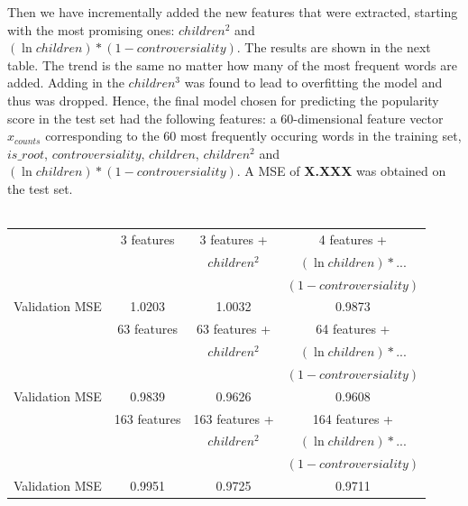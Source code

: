 \documentclass[11pt]{article}
\begin{document}
Then we have incrementally added the new features that were extracted, starting with the most promising ones: $children^{2}$ and $(\ln children)*(1-controversiality)$. The results are shown in the next table. The trend is the same no matter how many of the most frequent words are added. Adding in the $children^{3}$ was found to lead to overfitting the model and thus was dropped. Hence, the final model chosen for predicting the popularity score in the test set had the following features: a 60-dimensional feature vector $x_{counts}$ corresponding to the 60 most frequently occuring words in the training set, $is\_root$, $controversiality$, $children$, $children^{2}$ and $(\ln children)*(1-controversiality)$. A MSE of \textbf{X.XXX} was obtained on the test set. \\
\\

\begin{table}[h]
\centering
\begin{scriptsize}
\begin{tabular}[@{}c@{}]{|@{}c@{}|@{}c@{}|@{}c@{}|@{}c@{}|}
  \hline
   & 3 features & 3 features +  & 4 features + \\
   &  & $children^{2}$ &  $(\ln children)* ...$ \\
   &  &  &  $(1-controversiality)$ \\
   \hline
   Validation MSE & 1.0203 & 1.0032 & 0.9873\\
   \hline   
   \hline   
   & 63 features & 63 features +  & 64 features + \\
   &  & $children^{2}$ &  $(\ln children)*...$ \\
   &  &  &  $(1-controversiality)$ \\
   \hline
   Validation MSE & 0.9839 & 0.9626 & 0.9608\\
   \hline
   \hline   
   & 163 features & 163 features +  & 164 features + \\
   &  & $children^{2}$ &  $(\ln children)*...$ \\
   &  &  &  $(1-controversiality)$ \\
   \hline
   Validation MSE & 0.9951 & 0.9725 & 0.9711\\
  \hline
\end{tabular}
\end{scriptsize}
\end{table}
\end{document}
